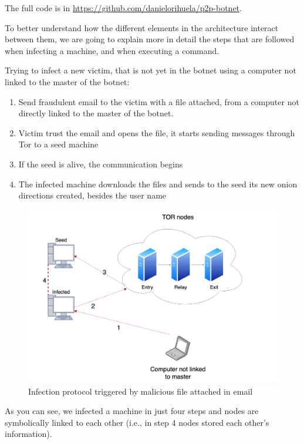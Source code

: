 \documentclass[11pt, a4paper,twoside]{tesi_upf}
\begin{document}
The full code is in \url{https://github.com/danielorihuela/p2p-botnet}.

To better understand how the different elements in the architecture interact between them, we are going to explain more in detail the steps that are followed when infecting a machine, and when executing a command.

Trying to infect a new victim, that is not yet in the botnet using a computer not linked to the master of the botnet:
\begin{enumerate}
    \item Send fraudulent email to the victim with a file attached, from a computer not directly linked to the master of the botnet.
    \item Victim trust the email and opens the file, it starts sending messages through Tor to a seed machine
    \item If the seed is alive, the communication begins
    \item The infected machine downloads the files and sends to the seed its new onion directions created, besides the user name
\end{enumerate}

\begin{figure}[H]
    \centering
    \includegraphics[width=\linewidth]{images/zoom.png}
    \caption{Infection protocol triggered by malicious file attached in email}
    \label{fig:botnet-architecture}
\end{figure}

As you can see, we infected a machine in just four steps and nodes are symbolically linked to each other (i.e., in step 4 nodes stored each other's information).
\end{document}
